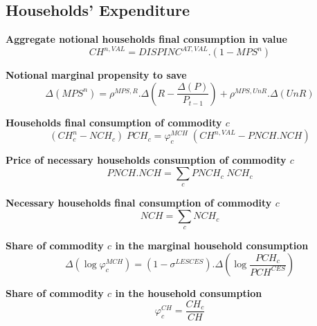 \documentclass[12pt]{article}
\numberwithin{equation}{section}
\begin{document}
\subsection{Households' Expenditure}



\noindent\textbf{Aggregate notional households final consumption in value} \\
\begin{dmath}
CH^{n,VAL} = DISPINC^{AT,VAL} . \left( 1 - MPS^{n} \right)
\end{dmath}

\noindent\textbf{Notional marginal propensity to save} \\
\begin{dmath}
\varDelta \left(MPS^{n}\right) = \rho^{MPS,R} . \varDelta \left(R - \frac{\varDelta \left(P\right)}{P_{t-1}}\right) + \rho^{MPS,UnR} . \varDelta \left(UnR\right)
\end{dmath}

\noindent\textbf{Households  final consumption of commodity $c$} \\
\begin{dmath}
\left( CH^{n}_{c} - NCH_{c} \right) \; PCH_{c} = \varphi^{MCH}_{c} \; \left( CH^{n,VAL} - PNCH . NCH \right)
\end{dmath}

\noindent\textbf{Price of necessary households consumption of commodity $c$} \\
\begin{dmath}
PNCH . NCH = \sum_{c} PNCH_{c} \; NCH_{c}
\end{dmath}

\noindent\textbf{Necessary households final consumption of commodity $c$} \\
\begin{dmath}
NCH = \sum_{c} NCH_{c}
\end{dmath}

\noindent\textbf{Share of commodity $c$ in the marginal household consumption} \\
\begin{dmath}
\varDelta \left(\operatorname{log} \varphi^{MCH}_{c}\right) = \left( 1 - \sigma^{LESCES} \right) . \varDelta \left(\operatorname{log} \frac{PCH_{c}}{PCH^{CES}}\right)
\end{dmath}

\noindent\textbf{Share of commodity $c$ in the household consumption} \\
\begin{dmath}
\varphi^{CH}_{c} = \frac{CH_{c}}{CH}
\end{dmath}
\end{document}
